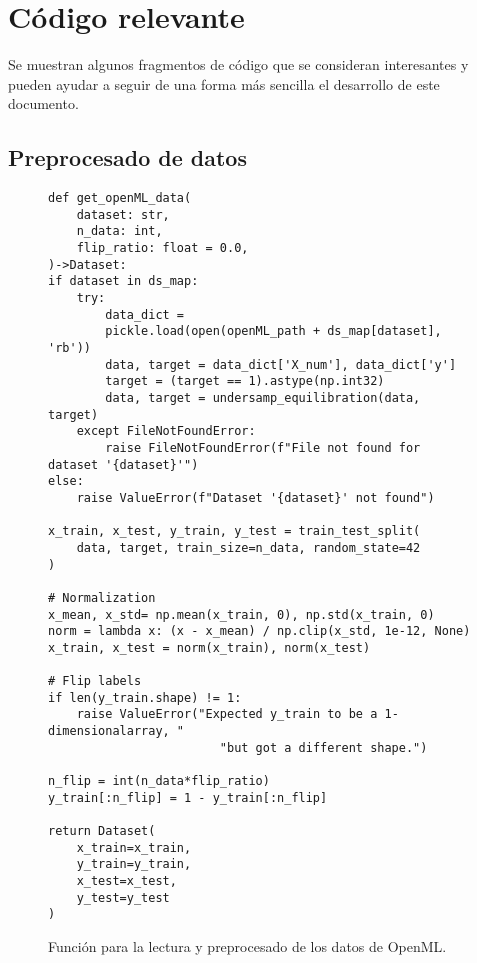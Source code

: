 \chapter{Código relevante}
\label{ap:apendice2}
\justifying
Se muestran algunos fragmentos de código que se consideran
interesantes y pueden ayudar a seguir de una forma más
sencilla el desarrollo de este documento.
\newpage



\section{Preprocesado de datos}
\begin{figure}[ht!]
    \begin{lstlisting}
def get_openML_data(
    dataset: str,
    n_data: int,
    flip_ratio: float = 0.0,
)->Dataset:
if dataset in ds_map:
    try:
        data_dict =
        pickle.load(open(openML_path + ds_map[dataset], 'rb'))
        data, target = data_dict['X_num'], data_dict['y']
        target = (target == 1).astype(np.int32)
        data, target = undersamp_equilibration(data, target)
    except FileNotFoundError:
        raise FileNotFoundError(f"File not found for dataset '{dataset}'")
else:
    raise ValueError(f"Dataset '{dataset}' not found")

x_train, x_test, y_train, y_test = train_test_split(
    data, target, train_size=n_data, random_state=42
)

# Normalization
x_mean, x_std= np.mean(x_train, 0), np.std(x_train, 0)
norm = lambda x: (x - x_mean) / np.clip(x_std, 1e-12, None)
x_train, x_test = norm(x_train), norm(x_test)

# Flip labels
if len(y_train.shape) != 1:
    raise ValueError("Expected y_train to be a 1-dimensionalarray, "
                        "but got a different shape.")

n_flip = int(n_data*flip_ratio)
y_train[:n_flip] = 1 - y_train[:n_flip]

return Dataset(
    x_train=x_train,
    y_train=y_train,
    x_test=x_test,
    y_test=y_test
)
    \end{lstlisting}
    \caption{Función para la lectura y preprocesado de los datos de OpenML.}
    \label{fig:preprocesado}
\end{figure}

\newpage

